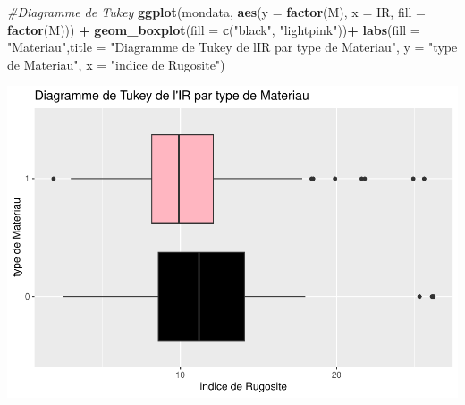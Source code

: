 \documentclass[
]{article}
\newenvironment{Shaded}{\begin{snugshade}}{\end{snugshade}}
\newcommand{\AttributeTok}[1]{\textcolor[rgb]{0.13,0.29,0.53}{#1}}
\newcommand{\CommentTok}[1]{\textcolor[rgb]{0.56,0.35,0.01}{\textit{#1}}}
\newcommand{\FunctionTok}[1]{\textcolor[rgb]{0.13,0.29,0.53}{\textbf{#1}}}
\newcommand{\NormalTok}[1]{#1}
\newcommand{\SpecialCharTok}[1]{\textcolor[rgb]{0.81,0.36,0.00}{\textbf{#1}}}
\newcommand{\StringTok}[1]{\textcolor[rgb]{0.31,0.60,0.02}{#1}}
\begin{document}
\begin{Shaded}
\begin{Highlighting}[]
\CommentTok{\#Diagramme de Tukey}
\FunctionTok{ggplot}\NormalTok{(mondata, }\FunctionTok{aes}\NormalTok{(}\AttributeTok{y =} \FunctionTok{factor}\NormalTok{(M), }\AttributeTok{x =}\NormalTok{ IR, }\AttributeTok{fill =} \FunctionTok{factor}\NormalTok{(M))) }\SpecialCharTok{+} \FunctionTok{geom\_boxplot}\NormalTok{(}\AttributeTok{fill =} \FunctionTok{c}\NormalTok{(}\StringTok{"black"}\NormalTok{, }\StringTok{"lightpink"}\NormalTok{))}\SpecialCharTok{+} \FunctionTok{labs}\NormalTok{(}\AttributeTok{fill =} \StringTok{"Materiau"}\NormalTok{,}\AttributeTok{title =} \StringTok{"Diagramme de Tukey de l\textquotesingle{}IR par type de Materiau"}\NormalTok{, }\AttributeTok{y =} \StringTok{"type de Materiau"}\NormalTok{, }\AttributeTok{x =} \StringTok{"indice de Rugosite"}\NormalTok{)}
\end{Highlighting}
\end{Shaded}

\includegraphics{devoir_files/figure-latex/unnamed-chunk-3-2.pdf}
\end{document}

